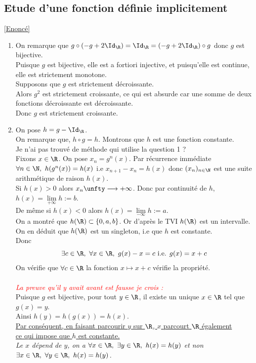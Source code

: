 \documentclass{book}
\begin{document}
	\subsection{Etude d'une fonction définie implicitement }
	\label{Etude d'une fonction définie implicitement corrigé}
	\textcolor{blue}{\hyperref[Etude d'une fonction définie implicitement]{[Enoncé]}}\\
	\begin{enumerate}[leftmargin=*]
	\item On remarque que $g\circ(-g+2\Id_\R)=\Id_\R=(-g+2\Id_\R)\circ g$ donc $g$ est bijective.\\
	Puisque $g$ est bijective, elle est a fortiori injective, et puisqu'elle est continue, elle est strictement monotone.\\
	Supposons que $g$ est strictement décroissante.\\
	Alors $g^2$ est strictement croissante, ce qui est absurde car une somme de deux fonctions décroissante est décroissante.\\
	Donc $g$ est strictement croissante.
	\item On pose $h=g-\Id_\R$.\\
	On remarque que, $h\circ g=h$. Montrons que $h$ est une fonction constante.\\
	Je n'ai pas trouvé de méthode qui utilise la question 1 ?\\
	Fixons $x\in \R$. On pose $x_n=g^n(x)$. Par récurrence immédiate $\forall n\in \N,\ h(g^n(x))=h(x)$ i.e $x_{n+1}-x_n=h(x)$ donc $(x_n)_{n\in \N}$ est une suite arithmétique de raison $h(x)$.\\
	Si $h(x)>0$ alors $x_n\unfty\longrightarrow+\infty$. Donc par continuité de $h$, $h(x)=\lim\limits_{+\infty}h:=b$.\\
	De même si $h(x)<0$ alors $h(x)=\lim\limits_{-\infty}h:=a$.\\
	On a montré que $h(\R)\subset \{0,a,b\}$. Or d'après le TVI $h(\R)$ est un intervalle. On en déduit que $h(\R)$ est un singleton, i.e que $h$ est constante.\\
	Donc \[\exists c\in\R,\ \forall x\in\R,\ g(x)-x=c \text{ i.e. } g(x)=x+c\]
	On vérifie que $\forall c\in\R$ la fonction $x\mapsto x+c$ vérifie la propriété.\\\\
	\textcolor{red}{\textit{La preuve qu'il y avait avant est fausse je crois :}}\\
	Puisque $g$ est bijective, pour tout $y\in \R$, il existe un unique $x\in \R$ tel que $g(x)=y$.\\
	Ainsi $h(y)=h(g(x))=h(x)$.\\
	\underline{Par conséquent, en faisant parcourir $y$ sur $\R$, $x$ parcourt $\R$ également}\\
	\underline{ce qui impose que $h$ est constante.}\\
	\textit{Le $x$ dépend de $y$, on a $\forall x\in \R,\ \exists y\in \R,\ h(x)=h(y)$ et non $\exists x\in \R,\ \forall y\in \R,\ h(x)=h(y)$.}
	\end{enumerate}
	
\end{document}
